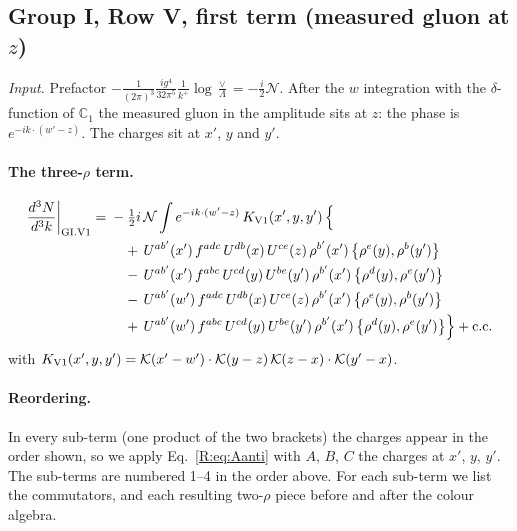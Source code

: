 \documentclass[10pt]{article}
\numberwithin{equation}{section}
\newcommand{\KK}{\mathcal K}
\newcommand{\NN}{\mathcal N}
\begin{document}
\subsection{Group I, Row V, first term (measured gluon at $z$)}\label{R:sec:GI.V1}
\emph{Input.} Prefactor $-\frac{1}{(2\pi)^3}\frac{ig^4}{32\pi^5}\frac1{k^+}\log\frac\vee\Lambda=-\frac i2\NN$. After the $w$ integration with the $\delta$-function of $\mathbb C_1$ the measured gluon in the amplitude sits at $z$: the phase is $e^{-ik\cdot(w'-z)}$. The charges sit at $x'$, $y$ and $y'$.
\paragraph{The three-$\rho$ term.}
\begin{align}
\frac{d^3N}{d^3k}\bigg|_{\rm GI.V1}={}&-\tfrac12i\,\NN\int e^{-ik\cdot(w'-z)}\,K_{\rm V1}(x',y,y')\,\Big\{\notag\\
&\quad +\,U^{ab'}(x')\,f^{adc}\,U^{db}(x)\,U^{ce}(z)\,\rho^{b'}(x')\,\big\{\rho^{e}(y),\rho^{b}(y')\big\}\notag\\
&\quad -\,U^{ab'}(x')\,f^{abc}\,U^{cd}(y)\,U^{be}(y')\,\rho^{b'}(x')\,\big\{\rho^{d}(y),\rho^{e}(y')\big\}\notag\\
&\quad -\,U^{ab'}(w')\,f^{adc}\,U^{db}(x)\,U^{ce}(z)\,\rho^{b'}(x')\,\big\{\rho^{e}(y),\rho^{b}(y')\big\}\notag\\
&\quad +\,U^{ab'}(w')\,f^{abc}\,U^{cd}(y)\,U^{be}(y')\,\rho^{b'}(x')\,\big\{\rho^{d}(y),\rho^{e}(y')\big\}\Big\}+{\rm c.c.}\label{R:eq:in-GI.V1}
\end{align}
with $K_{\rm V1}(x',y,y')=\KK(x'-w')\cdot\KK(y-z)\,\KK(z-x)\cdot\KK(y'-x)$.
\paragraph{Reordering.} In every sub-term (one product of the two brackets) the charges appear in the order shown, so we apply Eq.~\eqref{R:eq:Aanti} with $A$, $B$, $C$ the charges at $x'$, $y$, $y'$. The sub-terms are numbered 1--4 in the order above. For each sub-term we list the commutators, and each resulting two-$\rho$ piece before and after the colour algebra.
\end{document}
